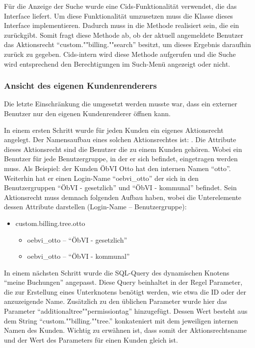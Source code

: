 Für die Anzeige der Suche wurde eine Cids-Funktionalität verwendet, die das Interface  liefert.
Um diese Funktionalität umzusetzen muss die Klasse  dieses Interface implementieren.
Dadurch muss in  die Methode  realisiert sein, die ein  zurückgibt.
Somit fragt diese Methode ab, ob der aktuell angemeldete Benutzer das Aktionsrecht "`custom.""billing.""search"' besitzt, um dieses Ergebnis daraufhin zurück zu gegeben.
Cids-intern wird diese Methode aufgerufen und die Suche wird entsprechend den Berechtigungen im Such-Menü angezeigt oder nicht. 

\subsubsection{Ansicht des eigenen Kundenrenderers}
Die letzte Einschränkung die umgesetzt werden musste war, dass ein externer Benutzer nur den eigenen Kundenrenderer öffnen kann.

In einem ersten Schritt wurde für jeden Kunden ein eigenes Aktionsrecht angelegt.
Der Namensaufbau eines solchen Aktionsrechtes ist: .
Die Attribute dieses Aktionsrecht sind die Benutzer die zu einem Kunden gehören. 
Wobei ein Benutzer für jede Benutzergruppe, in der er sich befindet, eingetragen werden muss.
Als Beispiel: der Kunden \ac{ÖbVI} Otto hat den internen Namen "`otto"'. Weiterhin hat er einen Login-Name "`oebvi\_otto"' der sich in den Benutzergruppen "`ÖbVI - gesetzlich"' und "`ÖbVI - kommunal"' befindet. Sein Aktionsrecht muss demnach folgenden Aufbau haben, wobei die Unterelemente dessen Attribute darstellen (Login-Name -- Benutzergruppe):
\begin{itemize}
\item custom.billing.tree.otto
\begin{itemize}
\item oebvi\_otto -- "`ÖbVI - gesetzlich"'
\item oebvi\_otto -- "`ÖbVI - kommunal"'
\end{itemize}
\end{itemize}

In einem nächsten Schritt wurde die SQL-Query des dynamischen Knotens "`meine Buchungen"' angepasst.
Diese Query beinhaltet in der Regel Parameter, die zur Erstellung eines Unterknotens benötigt werden, wie etwa die ID oder der anzuzeigende Name.
Zusätzlich zu den üblichen Parameter wurde hier das Parameter "`additionaltree""permissiontag"' hinzugefügt.
Dessen Wert besteht aus dem String "`custom.""billing.""tree."' konkateniert mit dem jeweiligen internen Namen des Kunden.
Wichtig zu erwähnen ist, dass somit der Aktionsrechtsname und der Wert des Parameters für einen Kunden gleich ist. 

